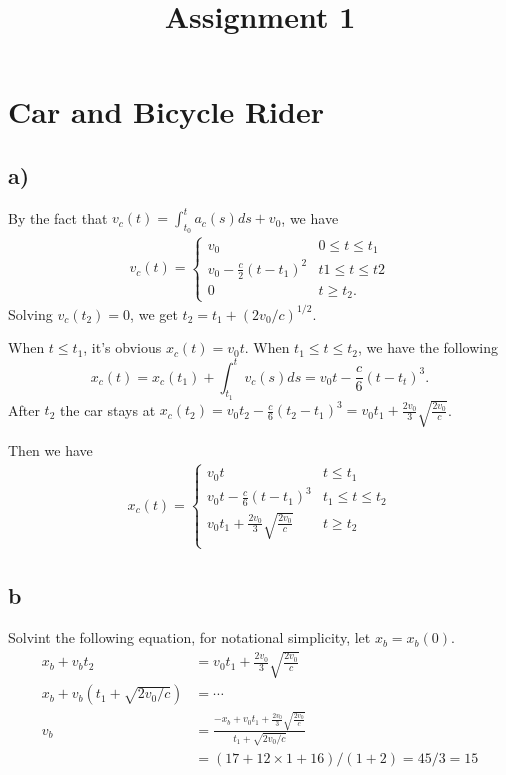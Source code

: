 \documentclass{article}
\title{Assignment 1}
\begin{document}
\section{Car and Bicycle Rider}
\subsection{a)}
By the fact that $v_c(t) = \int_{t_0}^t a_c(s) ds + v_0$, we have
\begin{align}
  v_c(t) = \begin{cases}
    v_0 & 0 \leq t \leq t_1 \\
    v_0 - \frac{c}{2}(t - t_1)^2 & t1 \leq t \leq t2\\
    0 & t \geq t_2.
  \end{cases} 
\end{align}
Solving $v_c(t_2) = 0$, we get $t_2 = t_1 + \left(2v_0 / c\right)^{1/2}$.

When $t \leq t_1$, it's obvious $x_c(t) = v_0 t$. When $t_1 \leq t \leq t_2$,
we have the following
\begin{equation}
  x_c(t) = x_c(t_1) + \int_{t_1}^{t}v_c(s) ds = v_0t - \frac{c}{6} (t - t_t)^3.
\end{equation}
After $t_2$ the car stays at $x_c(t_2) = v_0t_2 - \frac{c}{6}(t_2 - t_1)^3=v_0 t_1
+\frac{2v_0}{3}\sqrt{\frac{2v_0}{c}}$.

Then we have
\begin{align}
  x_c(t) = \begin{cases}
    v_0 t & t \leq t_1 \\
    v_0 t - \frac{c}{6}(t - t_1)^3 & t_1 \leq t \leq t_2 \\
    v_0t_1 + \frac{2v_0}{3}\sqrt{\frac{2v_0}{c}} & t \geq t_2\\
  \end{cases}
\end{align}

\subsection{b}
Solvint the following equation, for notational simplicity, let $x_b = x_b(0)$.
\begin{align*}
  x_b + v_b t_2  &= v_0 t_1 + \frac{2v_0}{3}\sqrt{\frac{2v_0}{c}}\\
  x_b + v_b(t_1 + \sqrt{2v_0/c}) &= \cdots\\
  v_b &= \frac{-x_b + v_0t_1 + \frac{2v_0}{3}\sqrt{\frac{2v_0}{c}}}{t_1 + \sqrt{2v_0/c}} \\
                 &= (17 + 12 \times 1 + 16) / (1 + 2) = 45 / 3 = 15
\end{align*}
\end{document}
